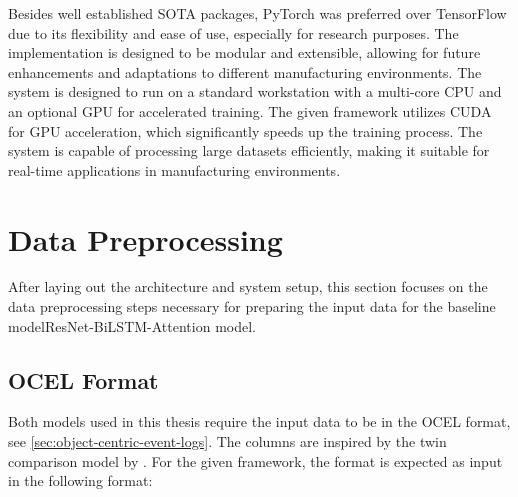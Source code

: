 Besides well established SOTA packages, PyTorch was preferred over TensorFlow due to its flexibility and ease of use, especially for research purposes. The implementation is designed to be modular and extensible, allowing for future enhancements and adaptations to different manufacturing environments.
The system is designed to run on a standard workstation with a multi-core CPU and an optional GPU for accelerated training. The given framework utilizes CUDA \autocite{NVIDIA_CUDA} for GPU acceleration, which significantly speeds up the training process. The system is capable of processing large datasets efficiently, making it suitable for real-time applications in manufacturing environments.


\section{Data Preprocessing}
\label{sec:event_log_processing}

After laying out the architecture and system setup, this section focuses on the data preprocessing steps necessary for preparing the input data for the baseline modelResNet-BiLSTM-Attention model.


\subsection{OCEL Format}

Both models used in this thesis require the input data to be in the OCEL format, see \autoref{sec:object-centric-event-logs}. The columns are inspired by the twin comparison model by \autocite{schwede2024learning}. For the given framework, the format is expected as input in the following format:

